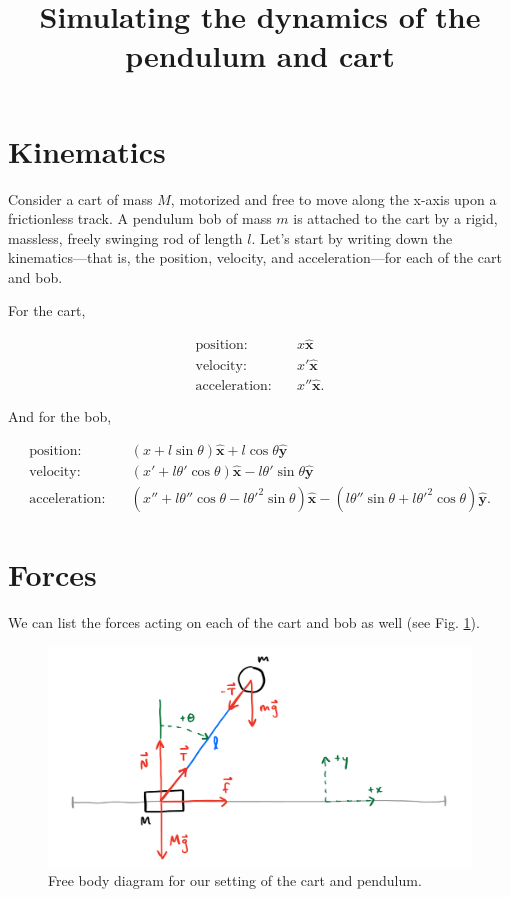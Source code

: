 \documentclass[12pt]{article}
\title{Simulating the dynamics of the pendulum and cart}
\date{}
\begin{document}
\maketitle

\section{Kinematics}

Consider a cart of mass $M$, motorized and free to move along the x-axis upon a frictionless track. A pendulum bob of mass $m$ is attached to the cart by a rigid, massless, freely swinging rod of length $l$. Let's start by writing down the kinematics---that is, the position, velocity, and acceleration---for each of the cart and bob.

For the cart,

\begin{align}
\mbox{position:} &\quad x \mathbf{\hat{x}} \nonumber\\[5pt]
\mbox{velocity:} &\quad x' \mathbf{\hat{x}} \nonumber\\[5pt]
\mbox{acceleration:} &\quad x'' \mathbf{\hat{x}}. \nonumber
\end{align}

And for the bob,

\begin{align}
\mbox{position:} &\quad (x + l \sin{\theta}) \mathbf{\hat{x}} + l \cos{\theta} \mathbf{\hat{y}} \nonumber\\[5pt]
\mbox{velocity:} &\quad (x' + l \theta' \cos{\theta}) \mathbf{\hat{x}} - l \theta' \sin{\theta} \mathbf{\hat{y}} \nonumber\\[5pt]
\mbox{acceleration:} &\quad (x'' + l \theta'' \cos{\theta} - l \theta'^2 \sin{\theta}) \mathbf{\hat{x}} - (l \theta'' \sin{\theta} + l \theta'^2 \cos{\theta}) \mathbf{\hat{y}}. \nonumber
\end{align}

\section{Forces}

We can list the forces acting on each of the cart and bob as well (see Fig. \ref{fig:free_body}).

\begin{figure}
\center
\includegraphics[width=0.9\linewidth]{free_body.png}
\caption{Free body diagram for our setting of the cart and pendulum.}
\label{fig:free_body}
\end{figure}
\end{document}
